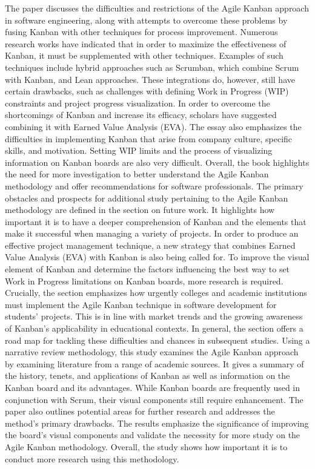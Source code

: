 \documentclass[conference]{IEEEtran}
\begin{document}
\begin{enumerate}
\newline
The paper \cite{kanban3} discusses the difficulties and restrictions of the Agile Kanban approach in software engineering, along with attempts to overcome these problems by fusing Kanban with other techniques for process improvement. Numerous research works have indicated that in order to maximize the effectiveness of Kanban, it must be supplemented with other techniques. Examples of such techniques include hybrid approaches such as Scrumban, which combine Scrum with Kanban, and Lean approaches. These integrations do, however, still have certain drawbacks, such as challenges with defining Work in Progress (WIP) constraints and project progress visualization. In order to overcome the shortcomings of Kanban and increase its efficacy, scholars have suggested combining it with Earned Value Analysis (EVA). The essay also emphasizes the difficulties in implementing Kanban that arise from company culture, specific skills, and motivation. Setting WIP limits and the process of visualizing information on Kanban boards are also very difficult. Overall, the book highlights the need for more investigation to better understand the Agile Kanban methodology and offer recommendations for software professionals.
\newline
The primary obstacles and prospects for additional study pertaining to the Agile Kanban methodology are defined in the section on future work. It highlights how important it is to have a deeper comprehension of Kanban and the elements that make it successful when managing a variety of projects. In order to produce an effective project management technique, a new strategy that combines Earned Value Analysis (EVA) with Kanban is also being called for. To improve the visual element of Kanban and determine the factors influencing the best way to set Work in Progress limitations on Kanban boards, more research is required. Crucially, the section emphasizes how urgently colleges and academic institutions must implement the Agile Kanban technique in software development for students' projects. This is in line with market trends and the growing awareness of Kanban's applicability in educational contexts. In general, the section offers a road map for tackling these difficulties and chances in subsequent studies.
\newline
Using a narrative review methodology, this study examines the Agile Kanban approach by examining literature from a range of academic sources. It gives a summary of the history, tenets, and applications of Kanban as well as information on the Kanban board and its advantages. While Kanban boards are frequently used in conjunction with Scrum, their visual components still require enhancement. The paper also outlines potential areas for further research and addresses the method's primary drawbacks. The results emphasize the significance of improving the board's visual components and validate the necessity for more study on the Agile Kanban methodology. Overall, the study shows how important it is to conduct more research using this methodology.


\end{enumerate}
\end{document}

